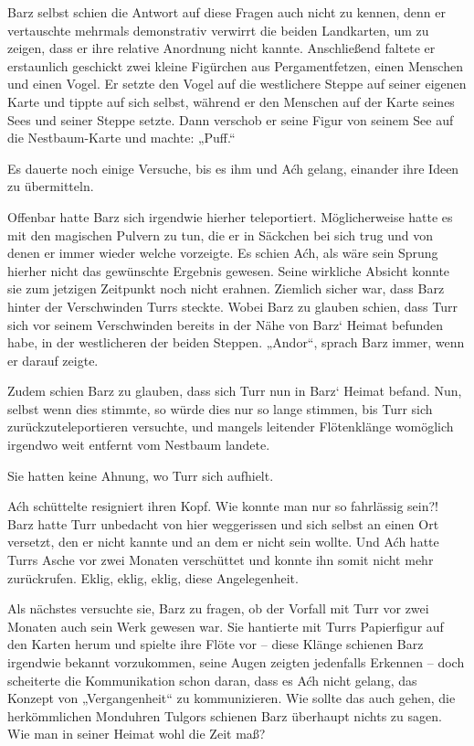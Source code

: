 Barz selbst schien die Antwort auf diese Fragen auch nicht zu kennen, denn er vertauschte mehrmals demonstrativ verwirrt die beiden Landkarten, um zu zeigen, dass er ihre relative Anordnung nicht kannte. Anschließend faltete er erstaunlich geschickt zwei kleine Figürchen aus Pergamentfetzen, einen Menschen und einen Vogel. Er setzte den Vogel auf die westlichere Steppe auf seiner eigenen Karte und tippte auf sich selbst, während er den Menschen auf der Karte seines Sees und seiner Steppe setzte. Dann verschob er seine Figur von seinem See auf die Nestbaum-Karte und machte: „Puff.“

Es dauerte noch einige Versuche, bis es ihm und Aćh gelang, einander ihre Ideen zu übermitteln.

Offenbar hatte Barz sich irgendwie hierher teleportiert. Möglicherweise hatte es mit den magischen Pulvern zu tun, die er in Säckchen bei sich trug und von denen er immer wieder welche vorzeigte. Es schien Aćh, als wäre sein Sprung hierher nicht das gewünschte Ergebnis gewesen. Seine wirkliche Absicht konnte sie zum jetzigen Zeitpunkt noch nicht erahnen. Ziemlich sicher war, dass Barz hinter der Verschwinden Turrs steckte. Wobei Barz zu glauben schien, dass Turr sich vor seinem Verschwinden bereits in der Nähe von Barz‘ Heimat befunden habe, in der westlicheren der beiden Steppen. „Andor“, sprach Barz immer, wenn er darauf zeigte.

Zudem schien Barz zu glauben, dass sich Turr nun in Barz‘ Heimat befand. Nun, selbst wenn dies stimmte, so würde dies nur so lange stimmen, bis Turr sich zurückzuteleportieren versuchte, und mangels leitender Flötenklänge womöglich irgendwo weit entfernt vom Nestbaum landete.

Sie hatten keine Ahnung, wo Turr sich aufhielt.

Aćh schüttelte resigniert ihren Kopf. Wie konnte man nur so fahrlässig sein?! Barz hatte Turr unbedacht von hier weggerissen und sich selbst an einen Ort versetzt, den er nicht kannte und an dem er nicht sein wollte. Und Aćh hatte Turrs Asche vor zwei Monaten verschüttet und konnte ihn somit nicht mehr zurückrufen. Eklig, eklig, eklig, diese Angelegenheit.

Als nächstes versuchte sie, Barz zu fragen, ob der Vorfall mit Turr vor zwei Monaten auch sein Werk gewesen war. Sie hantierte mit Turrs Papierfigur auf den Karten herum und spielte ihre Flöte vor – diese Klänge schienen Barz irgendwie bekannt vorzukommen, seine Augen zeigten jedenfalls Erkennen – doch scheiterte die Kommunikation schon daran, dass es Aćh nicht gelang, das Konzept von „Vergangenheit“ zu kommunizieren. Wie sollte das auch gehen, die herkömmlichen Monduhren Tulgors schienen Barz überhaupt nichts zu sagen. Wie man in seiner Heimat wohl die Zeit maß?

